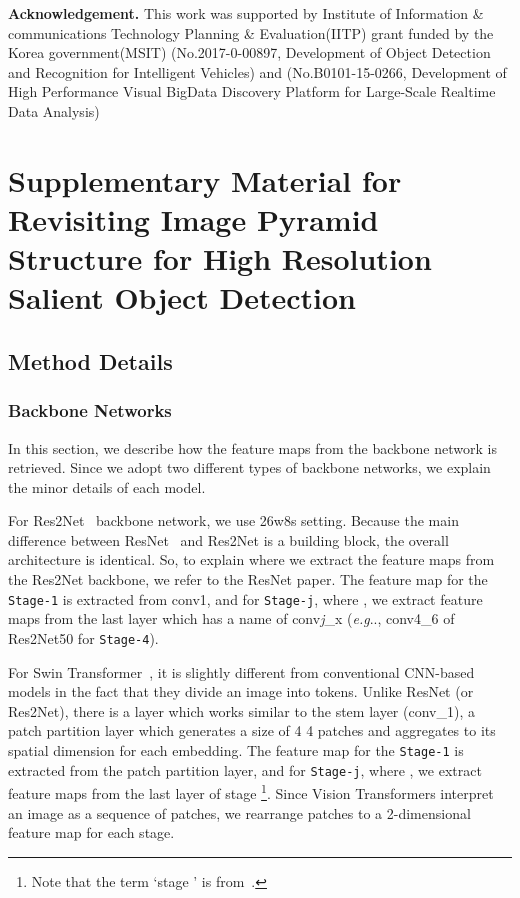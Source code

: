\documentclass{llncs}
\makeatletter
\DeclareRobustCommand\onedot{\futurelet\@let@token\@onedot}
\def\@onedot{\ifx\@let@token.\else.\null\fi\xspace}
\def\eg{\emph{e.g}\onedot} \def\Eg{\emph{E.g}\onedot}
\makeatother
\begin{document}
 \noindent
\textbf{Acknowledgement.}
This work was supported by Institute of Information \& communications Technology Planning \& Evaluation(IITP) grant funded by the Korea government(MSIT) 
(No.2017-0-00897, Development of Object Detection and Recognition for Intelligent Vehicles) and 
(No.B0101-15-0266, Development of High Performance Visual BigData Discovery Platform for Large-Scale Realtime Data Analysis) 



\appendix
{}
{}
\chapter*{Supplementary Material for Revisiting Image Pyramid Structure for High Resolution Salient Object Detection}
\setcounter{section}{0}
\renewcommand{\thesection}{\Alph{section}}

\section{Method Details}

\subsection{Backbone Networks}
In this section, we describe how the feature maps from the backbone network is retrieved. 
Since we adopt two different types of backbone networks, we explain the minor details of each model.

For Res2Net~\cite{gao2019res2net} backbone network, we use 26w8s setting.
Because the main difference between ResNet~\cite{he2016deep} and Res2Net is a building block, the overall architecture is identical.
So, to explain where we extract the feature maps from the Res2Net backbone, we refer to the ResNet paper. 
The feature map for the \texttt{Stage-1} is extracted from conv1, and for \texttt{Stage-j}, where , we extract feature maps from the last layer which has a name of conv\textit{j}\_x (\eg, conv4\_6 of Res2Net50 for \texttt{Stage-4}).

For Swin Transformer~\cite{liu2021swin}, it is slightly different from conventional CNN-based models in the fact that they divide an image into tokens.
Unlike ResNet (or Res2Net), there is a layer which works similar to the stem layer (conv\_1), 
a patch partition layer which generates a size of 4  4 patches and aggregates to its spatial dimension for each embedding.
The feature map for the \texttt{Stage-1} is extracted from the patch partition layer, and for \texttt{Stage-j}, where , we extract feature maps from the last layer of stage \footnote{Note that the term `stage ' is from~\cite{liu2021swin}.}.
Since Vision Transformers interpret an image as a sequence of patches, we rearrange patches to a 2-dimensional feature map for each stage.
\end{document}

